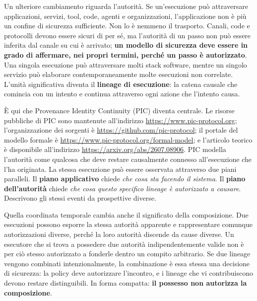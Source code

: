 \documentclass[10pt,oneside,openany]{book}
\newcommand{\term}[1]{\textbf{#1}}
\begin{document}
Un ulteriore cambiamento riguarda l'autorità. Se un'esecuzione può attraversare applicazioni, servizi, tool, code, agenti e organizzazioni, l'applicazione non è più un confine di sicurezza sufficiente. Non lo è nemmeno il trasporto. Canali, code e protocolli devono essere sicuri di per sé, ma l'autorità di un passo non può essere inferita dal canale su cui è arrivato; \textbf{un modello di sicurezza deve essere in grado di affermare, nei propri termini, perché un passo è autorizzato}. Una singola esecuzione può attraversare molti stack software, mentre un singolo servizio può elaborare contemporaneamente molte esecuzioni non correlate. L'unità significativa diventa il \term{lineage di esecuzione}: la catena causale che comincia con un intento e continua attraverso ogni azione che l'intento causa.

È qui che Provenance Identity Continuity (PIC) diventa centrale. Le risorse pubbliche di PIC sono mantenute all'indirizzo \url{https://www.pic-protocol.org}; l'organizzazione dei sorgenti è \url{https://github.com/pic-protocol}; il portale del modello formale è \url{https://www.pic-protocol.org/formal-model}; e l'articolo teorico è disponibile all'indirizzo \url{https://arxiv.org/abs/2607.08906}. PIC modella l'autorità come qualcosa che deve restare causalmente connesso all'esecuzione che l'ha originata. La stessa esecuzione può essere osservata attraverso due piani paralleli. Il \term{piano applicativo} chiede \emph{che cosa sta facendo il sistema}. Il \term{piano dell'autorità} chiede \emph{che cosa questo specifico lineage è autorizzato a causare}. Descrivono gli stessi eventi da prospettive diverse.


Quella coordinata temporale cambia anche il significato della composizione. Due esecuzioni possono esporre la stessa autorità apparente e rappresentare comunque autorizzazioni diverse, perché la loro autorità discende da cause diverse. Un esecutore che si trova a possedere due autorità indipendentemente valide non è per ciò stesso autorizzato a fonderle dentro un compito arbitrario. Se due lineage vengono combinati intenzionalmente, la combinazione è essa stessa una decisione di sicurezza: la policy deve autorizzare l'incontro, e i lineage che vi contribuiscono devono restare distinguibili. In forma compatta: \textbf{il possesso non autorizza la composizione}.
\end{document}
